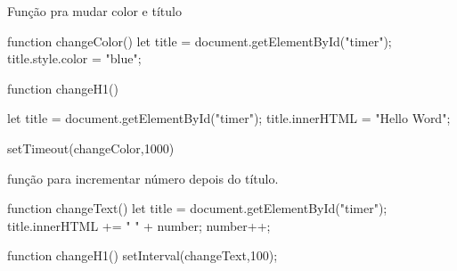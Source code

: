 Função pra mudar color e título


    function changeColor(){
      let title = document.getElementById("timer");
      title.style.color = "blue";
    }

    function changeH1(){
      let title = document.getElementById("timer");
      title.innerHTML = "Hello Word";

      setTimeout(changeColor,1000)
    }

função para incrementar número depois do título.

function changeText(){
  let title = document.getElementById("timer");
  title.innerHTML += " " + number;
  number++;
}

function changeH1(){
  setInterval(changeText,100);
}
